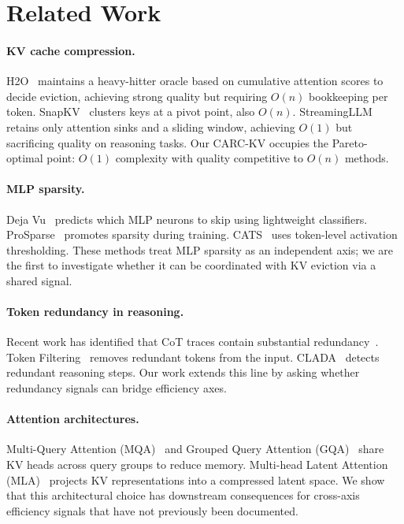 \documentclass[11pt,a4paper]{article}
\begin{document}
\section{Related Work}
\label{sec:related}

\paragraph{KV cache compression.}
H2O~\cite{zhang2024h2o} maintains a heavy-hitter oracle based on cumulative attention scores to decide eviction, achieving strong quality but requiring $O(n)$ bookkeeping per token.
SnapKV~\cite{li2024snapkv} clusters keys at a pivot point, also $O(n)$.
StreamingLLM~\cite{xiao2024streamingllm} retains only attention sinks and a sliding window, achieving $O(1)$ but sacrificing quality on reasoning tasks.
Our CARC-KV occupies the Pareto-optimal point: $O(1)$ complexity with quality competitive to $O(n)$ methods.

\paragraph{MLP sparsity.}
Deja Vu~\cite{liu2023dejavu} predicts which MLP neurons to skip using lightweight classifiers.
ProSparse~\cite{song2024prosparse} promotes sparsity during training.
CATS~\cite{lee2024cats} uses token-level activation thresholding.
These methods treat MLP sparsity as an independent axis; we are the first to investigate whether it can be coordinated with KV eviction via a shared signal.

\paragraph{Token redundancy in reasoning.}
Recent work has identified that CoT traces contain substantial redundancy~\cite{chen2024tokenfiltering,pan2024clada}.
Token Filtering~\cite{chen2024tokenfiltering} removes redundant tokens from the input.
CLADA~\cite{pan2024clada} detects redundant reasoning steps.
Our work extends this line by asking whether redundancy signals can bridge efficiency axes.

\paragraph{Attention architectures.}
Multi-Query Attention (MQA)~\cite{shazeer2019mqa} and Grouped Query Attention (GQA)~\cite{ainslie2023gqa} share KV heads across query groups to reduce memory.
Multi-head Latent Attention (MLA)~\cite{deepseek2024v2} projects KV representations into a compressed latent space.
We show that this architectural choice has downstream consequences for cross-axis efficiency signals that have not previously been documented.
\end{document}
